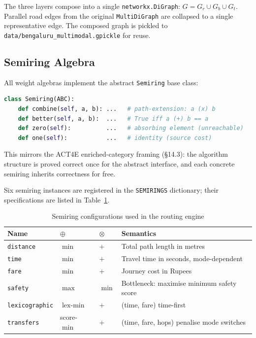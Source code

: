 \documentclass[12pt,a4paper]{article}
\newcommand{\opl}{\oplus}
\newcommand{\otm}{\otimes}
\begin{document}
The three layers compose into a single \texttt{networkx.DiGraph}:
$G = G_r \cup G_b \cup G_t$.
Parallel road edges from the original \texttt{MultiDiGraph} are collapsed
to a single representative edge.  The composed graph is pickled to
\texttt{data/bengaluru\_multimodal.gpickle} for reuse.

\subsection{Semiring Algebra}

All weight algebras implement the abstract \texttt{Semiring} base class:

\begin{lstlisting}[language=Python]
class Semiring(ABC):
    def combine(self, a, b): ...   # path-extension: a (x) b
    def better(self, a, b):  ...   # True iff a (+) b == a
    def zero(self):          ...   # absorbing element (unreachable)
    def one(self):           ...   # identity (source cost)
\end{lstlisting}

This mirrors the ACT4E enriched-category framing (§14.3): the algorithm
structure is proved correct once for the abstract interface, and each
concrete semiring inherits correctness for free.

Six semiring instances are registered in the \texttt{SEMIRINGS} dictionary;
their specifications are listed in Table~\ref{tab:semirings}.

\begin{table}[H]
\centering
\caption{Semiring configurations used in the routing engine}
\label{tab:semirings}
\setlength{\tabcolsep}{5pt}
\begin{tabular}{lllp{5.5cm}}
\toprule
\textbf{Name} & $\opl$ & $\otm$ & \textbf{Semantics} \\
\midrule
\texttt{distance}      & $\min$ & $+$ & Total path length in metres \\
\texttt{time}          & $\min$ & $+$ & Travel time in seconds, mode-dependent \\
\texttt{fare}          & $\min$ & $+$ & Journey cost in Rupees \\
\texttt{safety}        & $\max$ & $\min$ & Bottleneck: maximise minimum safety score \\
\texttt{lexicographic} & $\text{lex-}\min$ & $+$ & (time, fare)  time-first \\
\texttt{transfers}     & score-$\min$ & $+$ & (time, fare, hops)  penalise mode switches \\
\bottomrule
\end{tabular}
\end{table}
\end{document}
